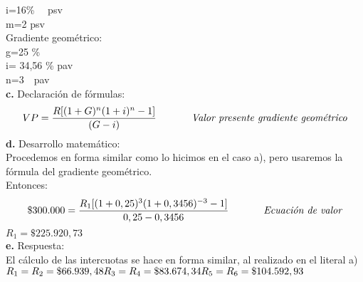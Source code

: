 	i=16\% \ \ psv \\
	m=2  psv\\

Gradiente geométrico:\\

	g=25 \%\\
	i= 34,56 \% pav \\
	n=3\ \ pav\\
	

\textbf{c.}	Declaración de fórmulas:
\begin{align*}
	VP=\frac{R[(1+G)^{n}(1+i)^{n}-1]}{(G-i)} \hspace{35 pt} \textit{Valor presente gradiente geométrico}\\
\end{align*}
\textbf{d.}	Desarrollo matemático:\\
Procedemos en forma similar como lo hicimos en el caso a), pero usaremos la fórmula del gradiente geométrico.\\

Entonces:
\begin{align*}
	\$ 300.000=\frac{R_{1} [(1+0,25)^{3} (1+0,3456)^{-3}-1]}{0,25-0,3456} \hspace{35 pt} \textit{Ecuación de valor}\\
\end{align*}
 $R_{1}  = \$225.920,73$\\

\textbf{e.}	Respuesta:\\
El cálculo de las intercuotas se hace en forma similar, al realizado en el literal a)\\


	$R_{1}=R_{2}=\$66.939,48 \\
	R_{3}=R_{4}= \$83.674,34 \\
	R_{5}=R_{6}= \$ 104.592,93$\\



